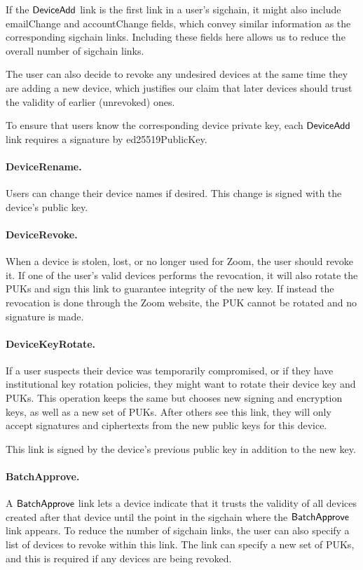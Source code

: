 If the $\mathsf{DeviceAdd}{}$ link is the first link in a user's sigchain, it might also include
\textsf{emailChange} and \textsf{accountChange} fields, which convey similar information as the
corresponding sigchain links. Including these fields here allows us to reduce the overall number of
sigchain links.

The user can also decide to revoke any undesired devices at the same time they are adding a new device,
which justifies our claim that later devices should trust the validity of earlier (unrevoked) ones.

To ensure that users know the corresponding device private key, each $\mathsf{DeviceAdd}{}$ link requires a
signature by \textsf{ed25519PublicKey}.

\paragraph{DeviceRename.} Users can change their device names if desired. This change is signed with
the device's public key.

\paragraph{DeviceRevoke.} When a device is stolen, lost, or no longer used for Zoom, the user should
revoke it. If one of the user’s valid devices performs the revocation, it will also rotate the PUKs
and sign this link to guarantee integrity of the new key. If instead the revocation is done through
the Zoom website, the PUK cannot be rotated and no signature is made.

\paragraph{DeviceKeyRotate.} If a user suspects their device was temporarily compromised, or if
they have institutional key rotation policies, they might want to rotate their device key and PUKs.
This operation keeps the same \deviceid but chooses new signing and encryption keys, as well as a
new set of PUKs. After others see this link, they will only accept signatures and ciphertexts from
the new public keys for this device.

This link is signed by the device's previous public key in addition to the new key.

\paragraph{BatchApprove.} A $\mathsf{BatchApprove}{}$ link lets a device indicate that it trusts the
validity of all devices created after that device until the point in the sigchain where the
$\mathsf{BatchApprove}{}$ link appears. To reduce the number of sigchain links, the user can also specify a
list of devices to revoke within this link. The link can specify a new set of PUKs, and this is
required if any devices are being revoked.

